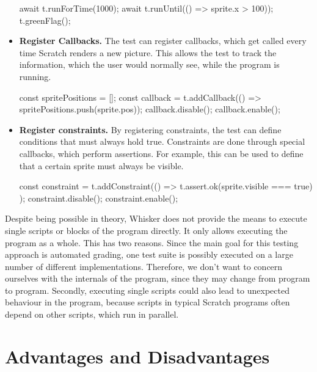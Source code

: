 \begin{itemize}
\begin{javascriptcode}
            await t.runForTime(1000);
            await t.runUntil(() => sprite.x > 100));
            t.greenFlag();
        \end{javascriptcode}
    \item \textbf{Register Callbacks.}
        The test can register callbacks, which get called every time Scratch renders a new picture.
        This allows the test to track the information, which the user would normally see, while the program is running.
        \begin{javascriptcode}
            const spritePositions = [];
            const callback = t.addCallback(() => spritePositions.push(sprite.pos));
            callback.disable();
            callback.enable();
        \end{javascriptcode}
    \item \textbf{Register constraints.}
        By registering constraints, the test can define conditions that must always hold true.
        Constraints are done through special callbacks, which perform assertions.
        For example, this can be used to define that a certain sprite must always be visible.
        \begin{javascriptcode}
            const constraint = t.addConstraint(() => {
                t.assert.ok(sprite.visible === true)
            });
            constraint.disable();
            constraint.enable();
        \end{javascriptcode}
\end{itemize}

\noindent Despite being possible in theory, Whisker does not provide the means to execute single scripts or blocks of the program directly.
It only allows executing the program as a whole.
This has two reasons.
Since the main goal for this testing approach is automated grading, one test suite is possibly executed on a large number of different implementations.
Therefore, we don't want to concern ourselves with the internals of the program, since they may change from program to program.
Secondly, executing single scripts could also lead to unexpected behaviour in the program, because scripts in typical Scratch programs often depend on other scripts, which run in parallel.

\section{Advantages and Disadvantages}

